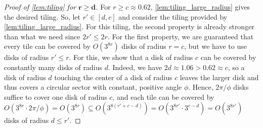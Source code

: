 \begin{proof}%
[Proof of \cref{lem:tiling} for $ \bm{r \geq d} $]
%
    For $ r \geq c \approx 0.62 $, \cref{lem:tiling_large_radius} gives the desired tiling.
    So, let $ r' \in [d, c] $ and consider the tiling provided by 
    \cref{lem:tiling_large_radius}.
    For this tiling, the second property is already stronger than what we need since $ 2r' \leq 2r $.
    For the first property, we are guaranteed that every tile can be covered by $ O(3^{8r}) $ disks of radius $ r = c $, but we have to use disks of radius $ r' \leq r $.
    For this, we show that a disk of radius $ c $ can be covered by constantly many disks of radius $ d $.
    Indeed, we have $ 2d \approx 1.06 > 0.62 \approx c $, so a disk of radius $ d $ touching the center of a disk of radius $ c $ leaves the larger disk and thus covers a circular sector with constant, positive angle $ \phi $.
    Hence, $ 2 \pi / \phi $ disks suffice to cover one disk of radius $ c $, and each tile can be covered by 
    $ O(3^{8r} \cdot 2 \pi / \phi) 
        = O(3^{8r}) 
        \subseteq O(3^{8(r' + c - d)}) 
        = O(3^{8 r'} \cdot 3^{c - d}) 
        = O(3^{8r'}) $ 
    disks of radius $ d \leq r' $.
\end{proof}
%
%
